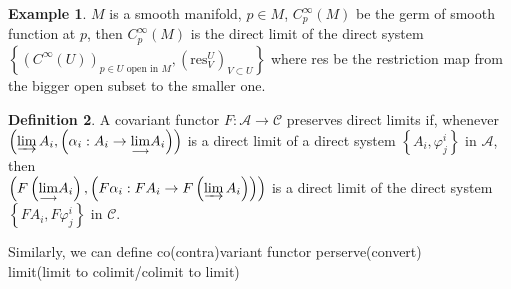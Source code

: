 \documentclass[a4paper,12pt]{article}
\newcommand{\bbrace}[1]{\left\{ #1 \right\} }
\theoremstyle{definition}
\newtheorem{defn}{Definition}[subsection]
\newtheorem{exam}[defn]{Example}
\begin{document}
\begin{exam}
    $M$ is a smooth manifold, $p\in M$, $C^{\infty}_p(M)$ be the germ of smooth function at $p$, then $C^{\infty}_p(M)$ is the direct limit of the direct system $\bbrace{(C^{\infty}(U))_{p\in U \text{ open in } M}, (\text{res}_{V}^{U})_{V\subset U} }$ where res be the restriction map from the bigger open subset to the smaller one.
\end{exam}
\begin{defn}
    A covariant functor $F: \mathcal{A} \rightarrow \mathcal{C}$ preserves direct limits if, whenever $\left(\varinjlim A_i,\left(\alpha_i: A_i \rightarrow \underset{\longrightarrow}{\lim } A_i\right)\right)$ is a direct limit of a direct system $\left\{A_i, \varphi_j^i\right\}$ in $\mathcal{A}$, then \\ $\left(F\left(\underset{\longrightarrow}{\lim } A_i\right),\left(F \alpha_i: F A_i \rightarrow F\left(\varinjlim  A_i\right)\right)\right)$ is a direct limit of the direct system $\left\{F A_i, F \varphi_j^i\right\}$ in $\mathcal{C}$.

    Similarly, we can define co(contra)variant functor perserve(convert) \\ limit(limit to colimit/colimit to limit)
\end{defn}
\end{document}
